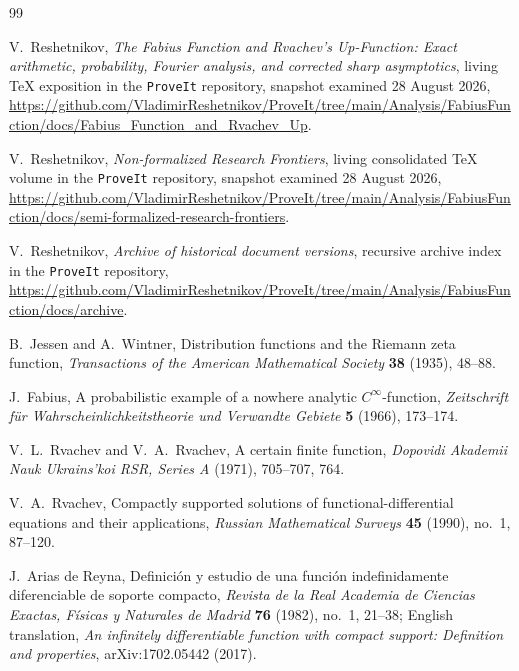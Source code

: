 \documentclass[11pt,oneside]{article}
\numberwithin{equation}{section}
\theoremstyle{definition}
\theoremstyle{remark}
\begin{document}
\begin{thebibliography}{99}

V.~Reshetnikov,
\newblock \emph{The Fabius Function and Rvachev's Up-Function: Exact arithmetic,
probability, Fourier analysis, and corrected sharp asymptotics},
\newblock living TeX exposition in the \texttt{ProveIt} repository, snapshot examined
28 August 2026,
\newblock \url{https://github.com/VladimirReshetnikov/ProveIt/tree/main/Analysis/FabiusFunction/docs/Fabius_Function_and_Rvachev_Up}.

V.~Reshetnikov,
\newblock \emph{Non-formalized Research Frontiers},
\newblock living consolidated TeX volume in the \texttt{ProveIt} repository, snapshot
examined 28 August 2026,
\newblock \url{https://github.com/VladimirReshetnikov/ProveIt/tree/main/Analysis/FabiusFunction/docs/semi-formalized-research-frontiers}.

V.~Reshetnikov,
\newblock \emph{Archive of historical document versions},
\newblock recursive archive index in the \texttt{ProveIt} repository,
\newblock \url{https://github.com/VladimirReshetnikov/ProveIt/tree/main/Analysis/FabiusFunction/docs/archive}.

B.~Jessen and A.~Wintner,
\newblock Distribution functions and the Riemann zeta function,
\newblock \emph{Transactions of the American Mathematical Society} \textbf{38}
(1935), 48--88.

J.~Fabius,
\newblock A probabilistic example of a nowhere analytic $C^\infty$-function,
\newblock \emph{Zeitschrift f\"ur Wahrscheinlichkeitstheorie und Verwandte Gebiete}
\textbf{5} (1966), 173--174.

V.~L.~Rvachev and V.~A.~Rvachev,
\newblock A certain finite function,
\newblock \emph{Dopovidi Akademii Nauk Ukrains'koi RSR, Series A} (1971),
705--707, 764.

V.~A.~Rvachev,
\newblock Compactly supported solutions of functional-differential equations and their
applications,
\newblock \emph{Russian Mathematical Surveys} \textbf{45} (1990), no.~1, 87--120.

J.~Arias de Reyna,
\newblock Definici\'on y estudio de una funci\'on indefinidamente diferenciable de
soporte compacto,
\newblock \emph{Revista de la Real Academia de Ciencias Exactas, F\'isicas y Naturales
de Madrid} \textbf{76} (1982), no.~1, 21--38;
English translation, \emph{An infinitely differentiable function with compact support:
Definition and properties}, arXiv:1702.05442 (2017).


\end{thebibliography}
\end{document}
